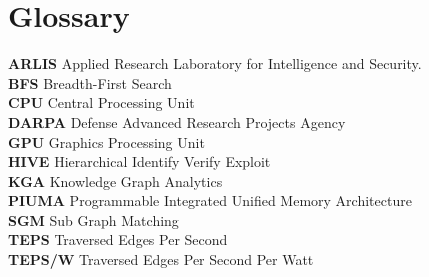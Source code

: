 \section{Glossary}
\small{
\textbf{ARLIS} Applied Research Laboratory for Intelligence and Security.\\ 
\textbf{BFS} Breadth-First Search \\
\textbf{CPU} Central Processing Unit \\
\textbf{DARPA} Defense Advanced Research Projects Agency \\ 
\textbf{GPU} Graphics Processing Unit \\
\textbf{HIVE} Hierarchical Identify Verify Exploit \\
\textbf{KGA} Knowledge Graph Analytics \\
\textbf{PIUMA} Programmable Integrated Unified Memory Architecture \\ 
\textbf{SGM} Sub Graph Matching \\
\textbf{TEPS} Traversed Edges Per Second \\
\textbf{TEPS/W} Traversed Edges Per Second Per Watt
}